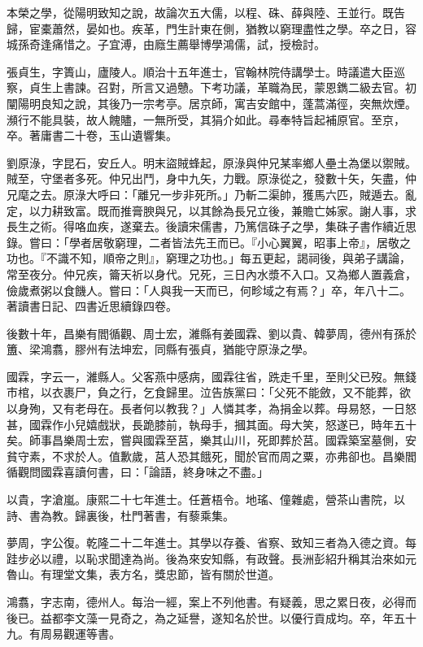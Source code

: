 \begin{pinyinscope}
本榮之學，從陽明致知之說，故論次五大儒，以程、硃、薛與陸、王並行。既告歸，宦橐蕭然，晏如也。疾革，門生計東在側，猶教以窮理盡性之學。卒之日，容城孫奇逢痛惜之。子宜溥，由廕生薦舉博學鴻儒，試，授檢討。

張貞生，字簣山，廬陵人。順治十五年進士，官翰林院侍講學士。時議遣大臣巡察，貞生上書諫。召對，所言又過戇。下考功議，革職為民，蒙恩鐫二級去官。初闡陽明良知之說，其後乃一宗考亭。居京師，寓吉安館中，蓬蒿滿徑，突無炊煙。瀕行不能具裝，故人餽贐，一無所受，其狷介如此。尋奉特旨起補原官。至京，卒。著庸書二十卷，玉山遺響集。

劉原淥，字昆石，安丘人。明末盜賊蜂起，原淥與仲兄某率鄉人壘土為堡以禦賊。賊至，守堡者多死。仲兄出鬥，身中九矢，力戰。原淥從之，發數十矢，矢盡，仲兄麾之去。原淥大呼曰：「離兄一步非死所。」乃斬二渠帥，獲馬六匹，賊遁去。亂定，以力耕致富。既而推膏腴與兄，以其餘為長兄立後，兼贍亡姊家。謝人事，求長生之術。得咯血疾，遂棄去。後讀宋儒書，乃篤信硃子之學，集硃子書作續近思錄。嘗曰：「學者居敬窮理，二者皆法先王而已。『小心翼翼，昭事上帝』，居敬之功也。『不識不知，順帝之則』，窮理之功也。」每五更起，謁祠後，與弟子講論，常至夜分。仲兄疾，籥天祈以身代。兄死，三日內水漿不入口。又為鄉人置義倉，儉歲煮粥以食饑人。嘗曰：「人與我一天而已，何畛域之有焉？」卒，年八十二。著讀書日記、四書近思續錄四卷。

後數十年，昌樂有閻循觀、周士宏，濰縣有姜國霖、劉以貴、韓夢周，德州有孫於簠、梁鴻翥，膠州有法坤宏，同縣有張貞，猶能守原淥之學。

國霖，字云一，濰縣人。父客燕中感病，國霖往省，跣走千里，至則父已歿。無錢巿棺，以衣裹尸，負之行，乞食歸里。泣告族黨曰：「父死不能斂，又不能葬，欲以身殉，又有老母在。長者何以教我？」人憐其孝，為捐金以葬。母易怒，一日怒甚，國霖作小兒嬉戲狀，長跪膝前，執母手，摑其面。母大笑，怒遂已，時年五十矣。師事昌樂周士宏，嘗與國霖至莒，樂其山川，死即葬於莒。國霖築室墓側，安貧守素，不求於人。值歉歲，莒人恐其餓死，聞於官而周之粟，亦弗卻也。昌樂閻循觀問國霖喜讀何書，曰：「論語，終身味之不盡。」

以貴，字滄嵐。康熙二十七年進士。任蒼梧令。地瑤、僮雜處，營茶山書院，以詩、書為教。歸裏後，杜門著書，有藜乘集。

夢周，字公復。乾隆二十二年進士。其學以存養、省察、致知三者為入德之資。每跬步必以禮，以恥求聞達為尚。後為來安知縣，有政聲。長洲彭紹升稱其治來如元魯山。有理堂文集，表方名，獎忠節，皆有關於世道。

鴻翥，字志南，德州人。每治一經，案上不列他書。有疑義，思之累日夜，必得而後已。益都李文藻一見奇之，為之延譽，遂知名於世。以優行貢成均。卒，年五十九。有周易觀運等書。


\end{pinyinscope}
